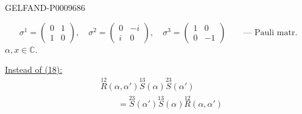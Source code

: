\begin{GelfandAdjacentEvidence}{GELFAND-P000968}{6}

\[
 \sigma^1=\begin{pmatrix}0&1\\1&0\end{pmatrix},\quad
 \sigma^2=\begin{pmatrix}0&-i\\i&0\end{pmatrix},\quad
 \sigma^3=\begin{pmatrix}1&0\\0&-1\end{pmatrix}
 \qquad\text{--- Pauli matr.}
\]
$\alpha,x\in\mathbb C$.

\underline{Instead of (18):}
\begin{equation*}
\begin{aligned}
 &\overset{12}{R}(\alpha,\alpha')\overset{13}{S}(\alpha)\overset{23}{S}(\alpha')\\
 &\qquad=\overset{23}{S}(\alpha')\overset{13}{S}(\alpha)\overset{12}{R}(\alpha,\alpha')
\end{aligned}\tag{25}
\end{equation*}
\end{GelfandAdjacentEvidence}


